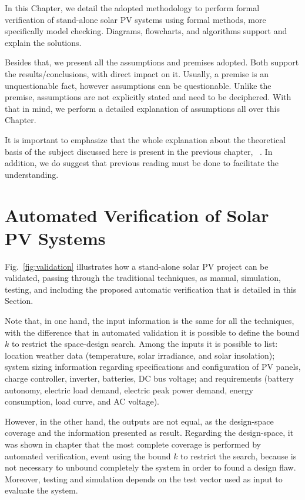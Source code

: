 %
%
In this Chapter, we detail the adopted methodology to perform formal verification of stand-alone solar PV systems using formal methods, more specifically model checking. Diagrams, flowcharts, and algorithms support and explain the solutions.

Besides that, we present all the assumptions and premises adopted. Both support the results/conclusions, with direct impact on it. Usually, a premise is an unquestionable fact, however assumptions can be questionable. Unlike the premise, assumptions are not explicitly stated and need to be deciphered. With that in mind, we perform a detailed explanation of assumptions all over this Chapter.

It is important to emphasize that the whole explanation about the theoretical basis of the subject discussed here is present in the previous chapter, ~. In addition, we do suggest that previous reading must be done to facilitate the understanding.

\section{Automated Verification of Solar PV Systems}

Fig.~\ref{fig:validation} illustrates how a stand-alone solar PV project can be validated, passing through the traditional techniques, as manual, simulation, testing, and including the proposed automatic verification that is detailed in this Section. 

Note that, in one hand, the input information is the same for all the techniques, with the difference that in automated validation it is possible to define the bound $k$ to restrict the space-design search. Among the inputs it is possible to list: location weather data (temperature, solar irradiance, and solar insolation); system sizing information regarding specifications and configuration of PV panels, charge controller, inverter, batteries, DC bus  voltage; and requirements (battery autonomy, electric load demand, electric peak power demand, energy consumption, load curve, and AC voltage).

However, in the other hand, the outputs are not equal, as the design-space coverage and the information presented as result. Regarding the design-space, it was shown in  chapter  that the most complete coverage is performed by automated verification, event using the bound $k$ to restrict the search, because is not necessary to unbound completely the system in order to found a design flaw. Moreover, testing and simulation depends on the test vector used as input to evaluate the system.

